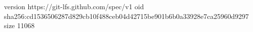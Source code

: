 version https://git-lfs.github.com/spec/v1
oid sha256:cd1536506287d829cb10f488ceb04d42715be901b6b0a33928e7ca25960d9297
size 11068
